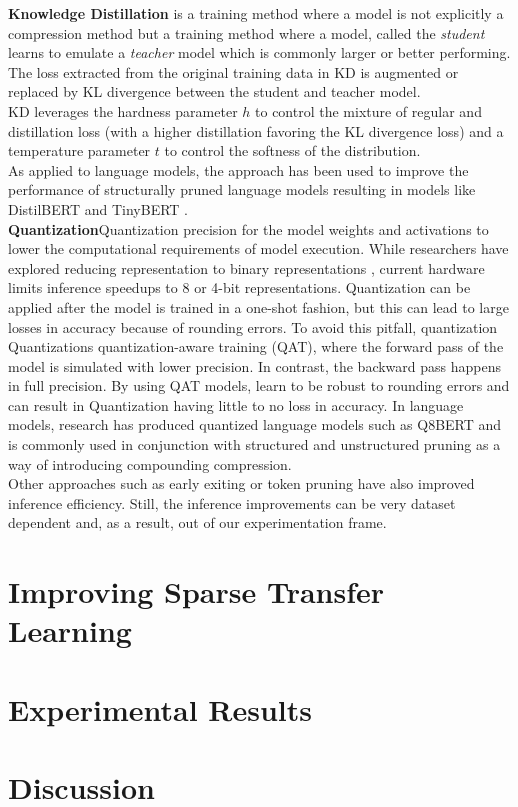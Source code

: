 \textbf{Knowledge Distillation} \cite{Hinton2015DistillingTK} is a training method where a model is not explicitly a compression method but a training method where a model, called the \textit{student} learns to emulate a \textit{teacher} model which is commonly larger or better performing. The loss extracted from the original training data in KD is augmented or replaced by KL divergence between the student and teacher model. \\
KD leverages the hardness parameter $h$ to control the mixture of regular and distillation loss (with a higher distillation favoring the KL divergence loss) and a temperature parameter $t$ to control the softness of the distribution. \\
As applied to language models, the approach has been used to improve the performance of structurally pruned language models resulting in models like DistilBERT \cite{sanh2019distilbert} and TinyBERT \cite{Jiao2020TinyBERTDB}. \\
\textbf{Quantization}Quantization precision for the model weights and activations to lower the computational requirements of model execution. While researchers have explored reducing representation to binary representations \cite{Pouransari2020LeastSB}, current hardware limits inference speedups to 8 or 4-bit representations. Quantization can be applied after the model is trained in a one-shot fashion, but this can lead to large losses in accuracy because of rounding errors. To avoid this pitfall, quantization Quantizations quantization-aware training (QAT), where the forward pass of the model is simulated with lower precision. In contrast, the backward pass happens in full precision. By using QAT models, learn to be robust to rounding errors and can result in Quantization having little to no loss in accuracy. In language models, research has produced quantized language models such as Q8BERT \cite{Zafrir2019Q8BERTQ8} and is commonly used in conjunction with structured and unstructured pruning \cite{Zafrir2021PruneOF} as a way of introducing compounding compression.\\
Other approaches such as early exiting \cite{Xin2020DeeBERTDE} or token pruning \cite{Kim2021LearnedTP} have also improved inference efficiency. Still, the inference improvements can be very dataset dependent and, as a result, out of our experimentation frame. \\
\section{Improving Sparse Transfer Learning}

\section{Experimental Results}

\section{Discussion}
